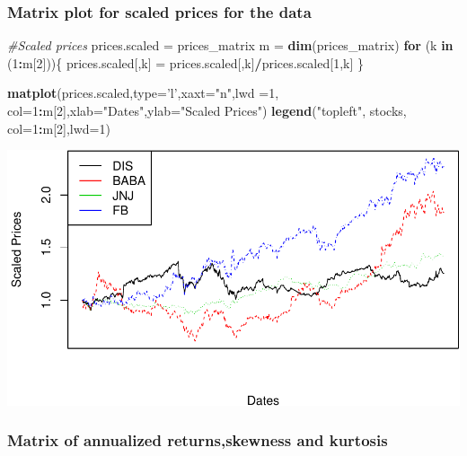 \documentclass[]{article}
\newenvironment{Shaded}{\begin{snugshade}}{\end{snugshade}}
\newcommand{\KeywordTok}[1]{\textcolor[rgb]{0.13,0.29,0.53}{\textbf{#1}}}
\newcommand{\DataTypeTok}[1]{\textcolor[rgb]{0.13,0.29,0.53}{#1}}
\newcommand{\DecValTok}[1]{\textcolor[rgb]{0.00,0.00,0.81}{#1}}
\newcommand{\StringTok}[1]{\textcolor[rgb]{0.31,0.60,0.02}{#1}}
\newcommand{\CommentTok}[1]{\textcolor[rgb]{0.56,0.35,0.01}{\textit{#1}}}
\newcommand{\ControlFlowTok}[1]{\textcolor[rgb]{0.13,0.29,0.53}{\textbf{#1}}}
\newcommand{\OperatorTok}[1]{\textcolor[rgb]{0.81,0.36,0.00}{\textbf{#1}}}
\newcommand{\NormalTok}[1]{#1}
\begin{document}
\subsubsection{Matrix plot for scaled prices for the
data}\label{matrix-plot-for-scaled-prices-for-the-data}

\begin{Shaded}
\begin{Highlighting}[]
\CommentTok{#Scaled prices}
\NormalTok{prices.scaled =}\StringTok{ }\NormalTok{prices_matrix}
\NormalTok{m =}\StringTok{ }\KeywordTok{dim}\NormalTok{(prices_matrix)}
\ControlFlowTok{for}\NormalTok{ (k }\ControlFlowTok{in}\NormalTok{ (}\DecValTok{1}\OperatorTok{:}\NormalTok{m[}\DecValTok{2}\NormalTok{]))\{}
\NormalTok{  prices.scaled[,k] =}\StringTok{ }\NormalTok{prices.scaled[,k]}\OperatorTok{/}\NormalTok{prices.scaled[}\DecValTok{1}\NormalTok{,k]}
\NormalTok{\}}

\KeywordTok{matplot}\NormalTok{(prices.scaled,}\DataTypeTok{type=}\StringTok{'l'}\NormalTok{,}\DataTypeTok{xaxt=}\StringTok{"n"}\NormalTok{,}\DataTypeTok{lwd =}\DecValTok{1}\NormalTok{,}
        \DataTypeTok{col=}\DecValTok{1}\OperatorTok{:}\NormalTok{m[}\DecValTok{2}\NormalTok{],}\DataTypeTok{xlab=}\StringTok{"Dates"}\NormalTok{,}\DataTypeTok{ylab=}\StringTok{"Scaled Prices"}\NormalTok{)}
\KeywordTok{legend}\NormalTok{(}\StringTok{"topleft"}\NormalTok{, stocks, }\DataTypeTok{col=}\DecValTok{1}\OperatorTok{:}\NormalTok{m[}\DecValTok{2}\NormalTok{],}\DataTypeTok{lwd=}\DecValTok{1}\NormalTok{)}
\end{Highlighting}
\end{Shaded}

\includegraphics{Markowitz_Research_Me_files/figure-latex/unnamed-chunk-6-1.pdf}

\subsubsection{Matrix of annualized returns,skewness and
kurtosis}\label{matrix-of-annualized-returnsskewness-and-kurtosis}
\end{document}
